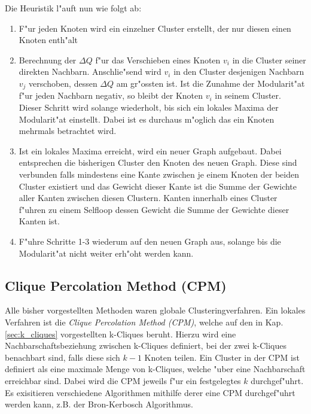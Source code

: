 \documentclass[journal]{vgtc}
\begin{document}
    Die Heuristik l"auft nun wie folgt ab:
    \begin{enumerate}
      \item F"ur jeden Knoten wird ein einzelner Cluster erstellt, der nur diesen einen Knoten enth"alt
      \item Berechnung der $\Delta Q$ f"ur das Verschieben eines Knoten $v_i$ in die Cluster seiner 
      		direkten Nachbarn. Anschlie"send wird $v_i$ in den Cluster desjenigen Nachbarn $v_j$ verschoben,
      		dessen $\Delta Q$ am gr"ossten ist. Ist die Zunahme der Modularit"at f"ur jeden Nachbarn negativ,
      		so bleibt der Knoten $v_i$ in seinem Cluster. Dieser Schritt wird solange wiederholt, bis sich
      		ein lokales Maxima der Modularit"at einstellt. Dabei ist es durchaus m"oglich das ein Knoten
      		mehrmals betrachtet wird.
      \item Ist ein lokales Maxima erreicht, wird ein neuer Graph aufgebaut. Dabei entsprechen die bisherigen
      		Cluster den Knoten des neuen Graph. Diese sind verbunden falls mindestens eine Kante zwischen
      		je einem Knoten der beiden Cluster existiert und das Gewicht dieser Kante ist die Summe
      		der Gewichte aller Kanten zwischen diesen Clustern. Kanten innerhalb eines Cluster f"uhren zu einem
      		Selfloop dessen Gewicht die Summe der Gewichte dieser Kanten ist. 
      \item F"uhre Schritte 1-3 wiederum auf den neuen Graph aus, solange bis die Modularit"at nicht
      		weiter erh"oht werden kann.
    \end{enumerate}
    
  \subsection{Clique Percolation Method (CPM)}
    \label{sec:CPM}
    Alle bisher vorgestellten Methoden waren globale Clusteringverfahren. Ein lokales Verfahren ist die
    \emph{Clique Percolation Method (CPM)}\cite{CPM}, welche auf den in Kap. \ref{sec:k_cliques}
    vorgestellten k-Cliques beruht. Hierzu wird eine Nachbarschaftsbeziehung zwischen k-Cliques definiert, 
    bei der zwei k-Cliques benachbart sind, falls diese sich $k-1$ Knoten teilen. 
    Ein Cluster in der CPM ist definiert als eine maximale Menge von k-Cliques, welche "uber eine Nachbarschaft
    erreichbar sind. Dabei wird die CPM jeweils f"ur ein festgelegtes $k$ durchgef"uhrt. Es exisitieren 
    verschiedene Algorithmen mithilfe derer eine CPM durchgef"uhrt werden kann, z.B. der Bron-Kerbosch Algorithmus.
    
\end{document}
